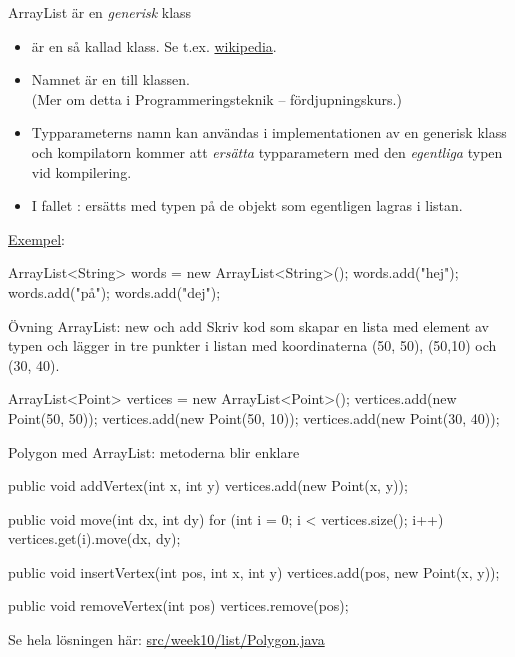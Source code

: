 \documentclass{lecturenotes}
\begin{document}
\begin{Slide}{ArrayList är en \emph{generisk} klass}\footnotesize
\begin{itemize}
\item {} är en så kallad   klass. Se t.ex. \href{https://en.wikipedia.org/wiki/Generics_in_Java}{wikipedia}.
\item Namnet  är en  till klassen. \\(Mer om detta i Programmeringsteknik – fördjupningskurs.)
\item Typparameterns namn kan användas i implementationen av en generisk klass och kompilatorn kommer att \emph{ersätta} typparametern med den \emph{egentliga} typen vid kompilering.
\item I fallet :  ersätts med typen på de objekt som egentligen lagras i listan.  
\end{itemize}
\href{}{Exempel}:
\begin{Code}[numberstyle=]
        ArrayList<String> words = new ArrayList<String>();
        words.add("hej");
        words.add("på");
        words.add("dej");
\end{Code}
\end{Slide}

\begin{Slide}{Övning ArrayList: new och add}
Skriv kod som skapar en lista med element av typen  och lägger in tre punkter i listan med koordinaterna (50, 50), (50,10) och (30, 40).
\pause
\begin{Code}[numberstyle=]
ArrayList<Point> vertices = new ArrayList<Point>(); 
vertices.add(new Point(50, 50));
vertices.add(new Point(50, 10)); 
vertices.add(new Point(30, 40)); 
\end{Code}


\end{Slide}

\begin{Slide}{Polygon med ArrayList: metoderna blir enklare}
\begin{Code}[numberstyle=]
    public void addVertex(int x, int y) {  
        vertices.add(new Point(x, y));
    }
    
    public void move(int dx, int dy) {
        for (int i = 0; i < vertices.size(); i++) {
        	vertices.get(i).move(dx, dy);
        }
    }
    
    public void insertVertex(int pos, int x, int y) {
    	vertices.add(pos, new Point(x, y));
    }
    
    public void removeVertex(int pos) {
    	vertices.remove(pos);
    }
\end{Code}

Se hela lösningen här:
\href{https://github.com/bjornregnell/lth-eda016-2015/blob/master/lectures/examples/eclipse-ws/lecture-examples/src/week10/list/Polygon.java}{src/week10/list/Polygon.java}
\end{Slide}
\end{document}
